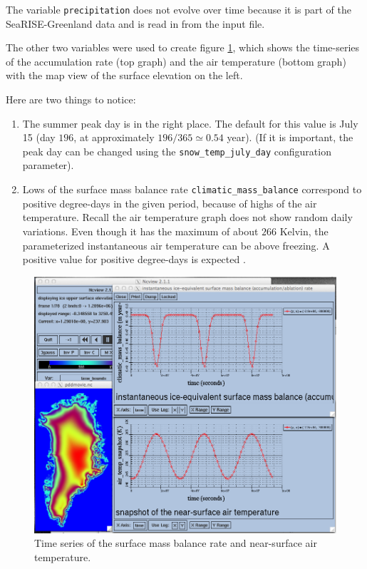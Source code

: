 \documentclass[titlepage,letterpaper,final]{scrartcl}
\begin{document}
The variable \texttt{precipitation} does not evolve over time because
it is part of the SeaRISE-Greenland data and is read in from the input file.

The other two variables were used to create figure \ref{fig:pddseries}, which
shows the time-series of the accumulation rate (top graph) and the air
temperature (bottom graph)  with the map view of the surface elevation on the left.

Here are two things to notice:
\begin{enumerate}
\item The summer peak day is in the right place.  The default for this value is
  July 15 (day $196$, at approximately $196/365 \simeq 0.54$ year).  (If it is
  important, the peak day can be changed using the \texttt{snow_temp_july_day}
  configuration parameter).

\item Lows of the surface mass balance rate \texttt{climatic_mass_balance} correspond to
  positive degree-days in the given period, because of highs of the air
  temperature.  Recall the air temperature graph does
  not show random daily variations.  Even though it has the maximum of about $266$
  Kelvin, the parameterized instantaneous air temperature can be above freezing.
  A positive value for positive degree-days is expected \cite{CalovGreve05}.
\end{enumerate}

\begin{figure}[ht]
  \centering
  \includegraphics[width=5in]{pdd-movie}
  \caption{Time series of the surface mass balance rate and near-surface air temperature.}
  \label{fig:pddseries}
\end{figure}
\end{document}

